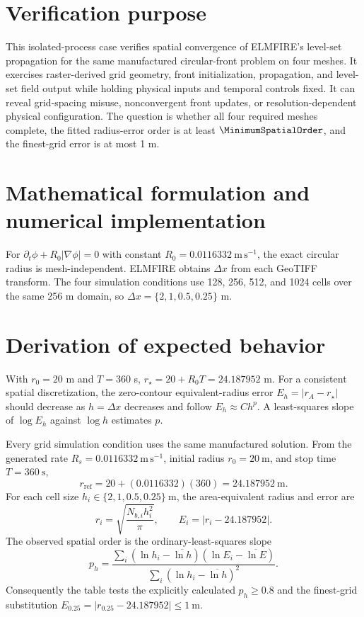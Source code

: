 \section{Verification purpose}

This isolated-process case verifies spatial convergence of ELMFIRE's level-set propagation for the same manufactured circular-front problem on four meshes. It exercises raster-derived grid geometry, front initialization, propagation, and level-set field output while holding physical inputs and temporal controls fixed. It can reveal grid-spacing misuse, nonconvergent front updates, or resolution-dependent physical configuration. The question is whether all four required meshes complete, the fitted radius-error order is at least \(\MinimumSpatialOrder\), and the finest-grid error is at most 1 m.

\section{Mathematical formulation and numerical implementation}

For \(\partial_t\phi+R_0|\nabla\phi|=0\) with constant \(R_0=0.0116332~\mathrm{m\,s^{-1}}\), the exact circular radius is mesh-independent. ELMFIRE obtains \(\Delta x\) from each GeoTIFF transform. The four simulation conditions use 128, 256, 512, and 1024 cells over the same 256 m domain, so \(\Delta x=\{2,1,0.5,0.25\}\) m.

\section{Derivation of expected behavior}

With \(r_0=20\) m and \(T=360\) s, \(r_\star=20+R_0T=24.187952\) m. For a consistent spatial discretization, the zero-contour equivalent-radius error \(E_h=|r_A-r_\star|\) should decrease as \(h=\Delta x\) decreases and follow \(E_h\approx Ch^p\). A least-squares slope of \(\log E_h\) against \(\log h\) estimates \(p\).

Every grid simulation condition uses the same manufactured solution.  From the generated
rate \(R_s=0.0116332~\mathrm{m\,s^{-1}}\), initial radius
\(r_0=20~\mathrm{m}\), and stop time \(T=360~\mathrm{s}\),
\[
 r_{\mathrm{ref}}=20+(0.0116332)(360)=24.187952~\mathrm{m}.
\]
For each cell size \(h_i\in\{2,1,0.5,0.25\}~\mathrm{m}\), the area-equivalent
radius and error are
\[
 r_i=\sqrt{\frac{N_{b,i}h_i^2}{\pi}},\qquad E_i=|r_i-24.187952|.
\]
The observed spatial order is the ordinary-least-squares slope
\[
 p_h=\frac{\sum_i(\ln h_i-\overline{\ln h})(\ln E_i-\overline{\ln E})}
 {\sum_i(\ln h_i-\overline{\ln h})^2}.
\]
Consequently the table tests the explicitly calculated \(p_h\geq0.8\) and
the finest-grid substitution \(E_{0.25}=|r_{0.25}-24.187952|\leq1~\mathrm{m}\).


